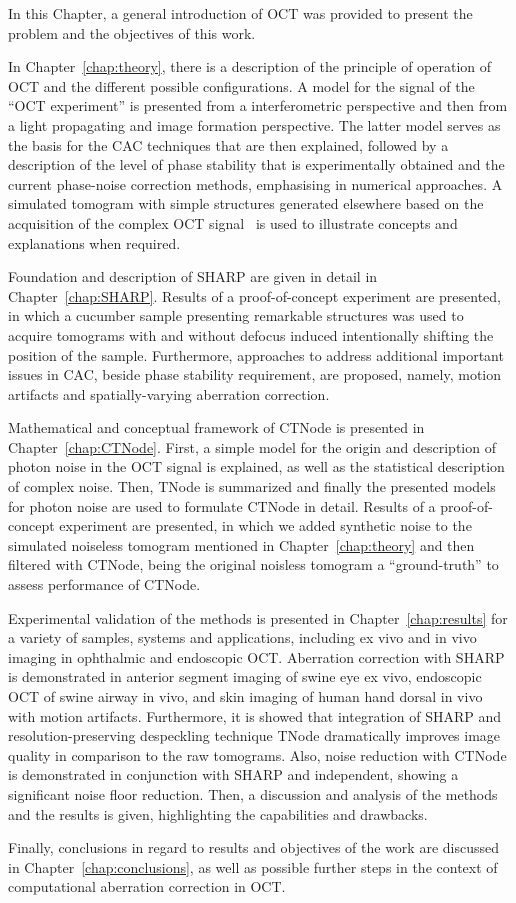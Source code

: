 In this Chapter, a general introduction of OCT was provided to present the problem and the objectives of this work.

In Chapter~\ref{chap:theory}, there is a description of the principle of operation of OCT and the different possible configurations. A model for the signal of the ``OCT experiment'' is presented from a interferometric perspective and then from a light propagating and image formation perspective. The latter model serves as the basis for the CAC techniques that are then explained, followed by a description of the level of phase stability that is experimentally obtained and the current phase-noise correction methods, emphasising in numerical approaches. A simulated tomogram with simple structures generated elsewhere based on the acquisition of the complex OCT signal~\cite{} is used to illustrate concepts and explanations when required.

Foundation and description of SHARP are given in detail in Chapter~\ref{chap:SHARP}. Results of a proof-of-concept experiment are presented, in which a cucumber sample presenting remarkable structures was used to acquire tomograms with and without defocus induced intentionally shifting the position of the sample. Furthermore, approaches to address additional important issues in CAC, beside phase stability requirement, are proposed, namely, motion artifacts and spatially-varying aberration correction.

Mathematical and conceptual framework of CTNode is presented in Chapter~\ref{chap:CTNode}. First, a simple model for the origin and description of photon noise in the OCT signal is explained, as well as the statistical description of complex noise. Then, TNode is summarized and finally the presented models for photon noise are used to formulate CTNode in detail. Results of a proof-of-concept experiment are presented, in which we added synthetic noise to the simulated noiseless tomogram mentioned in Chapter~\ref{chap:theory} and then filtered with CTNode, being the original noisless tomogram a ``ground-truth'' to assess performance of CTNode.

Experimental validation of the methods is presented in Chapter~\ref{chap:results} for a variety of samples, systems and applications, including ex vivo and in vivo imaging in ophthalmic and endoscopic OCT. Aberration correction with SHARP is demonstrated in anterior segment imaging of swine eye ex vivo, endoscopic OCT of swine airway in vivo, and skin imaging of human hand dorsal in vivo with motion artifacts. Furthermore, it is showed that integration of SHARP and resolution-preserving despeckling technique TNode dramatically improves image quality in comparison to the raw tomograms. Also, noise reduction with CTNode is demonstrated in conjunction with SHARP and independent, showing a significant noise floor reduction. Then, a discussion and analysis of the methods and the results is given, highlighting the capabilities and drawbacks.

Finally, conclusions in regard to results and objectives of the work are discussed in Chapter~\ref{chap:conclusions}, as well as possible further steps in the context of computational aberration correction in OCT.